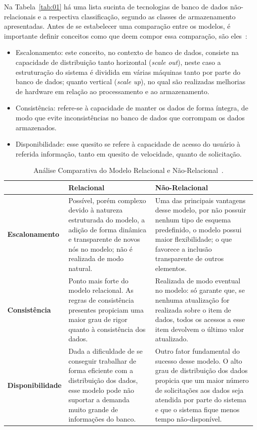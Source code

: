 Na Tabela~\ref{tab:01} há uma lista sucinta de tecnologias de banco de dados não-relacionais e a respectiva classificação, segundo as classes de armazenamento apresentadas.
Antes de se estabelecer uma comparação entre os modelos, é importante definir conceitos como que deem compor essa comparação, são eles~\cite{toth2011abordagem,brito2010bancos}:

\begin{itemize}
\item Escalonamento: este conceito, no contexto de banco de dados, consiste na capacidade de distribuição tanto horizontal (\textit{scale out}), neste caso a estruturação do sistema é dividida em várias máquinas tanto por parte do banco de dados; quanto vertical (\textit{scale up}), no qual são realizadas melhorias de hardware em relação ao processamento e ao armazenamento.

\item Consistência: refere-se à capacidade de manter os dados de forma íntegra, de modo que evite inconsistências no banco de dados que corrompam os dados armazenados.

\item Disponibilidade: esse quesito se refere à capacidade de acesso do usuário à referida informação, tanto em quesito de velocidade, quanto de solicitação.
\end{itemize}

\begin{table}[!bth]

\centering
\caption{Análise Comparativa do Modelo Relacional e Não-Relacional~\cite{brito2010bancos}.}
\label{tabela:comparativo}
\begin{tabular}{l|p{5.7cm}|p{5.7cm}}
\hline
 & \textbf{Relacional} & \textbf{Não-Relacional} \\ 
\hline                               
\textbf{Escalonamento} & Possível, porém complexo devido à natureza estruturada do modelo, a adição de forma dinâmica e transparente de novos nós no modelo; não é realizada de modo natural. & Uma das principais vantagens desse modelo, por não possuir nenhum tipo de esquema predefinido, o modelo possui maior flexibilidade; o que favorece a inclusão transparente de outros elementos.\\
\hline
\textbf{Consistência} & Ponto mais forte do modelo relacional. As regras de consistência presentes propiciam uma maior grau de rigor quanto à consistência dos dados. & Realizada de modo eventual no modelo: só garante que, se nenhuma atualização for realizada sobre o item de dados, todos os acessos a esse item devolvem o último valor atualizado. \\
\hline
\textbf{Disponibilidade} & Dada a dificuldade de se conseguir trabalhar de forma eficiente com a distribuição dos dados, esse modelo pode não suportar a demanda muito grande de informações do banco. & Outro fator fundamental do sucesso desse modelo. O alto grau de distribuição dos dados propicia que um maior número de solicitações aos dados seja atendida por parte do sistema e que o sistema fique menos tempo não-disponível. \\
\hline
\end{tabular}
\normalsize
\end{table}

